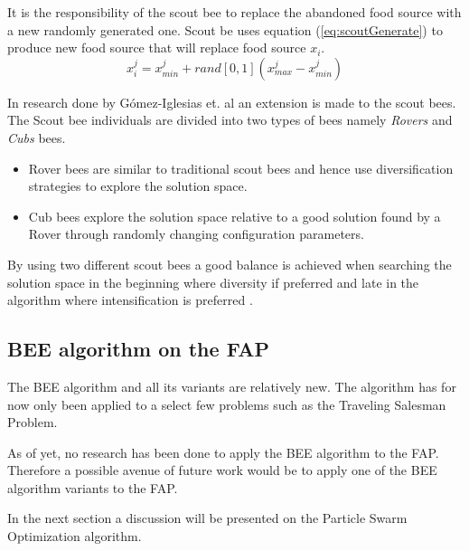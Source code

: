 It is the responsibility of the scout bee to replace the abandoned food source with a new randomly generated one. Scout be uses equation (\ref{eq:scoutGenerate}) to produce new food source that will replace food source $x_i$.
\begin{equation}
\label{eq:scoutGenerate}
x^j_i = x^j_{min} + rand[0,1](x^j_{max} - x^j_{min})
\end{equation}

In research done by G\'{o}mez-Iglesias et. al \cite{ABCFusionGrid} an extension is made to the scout bees. The Scout bee individuals are divided into two types of bees namely \emph{Rovers} and \emph{Cubs} bees\cite{ABCFusionGrid}.
\begin{itemize}
\item{Rover bees} are similar to traditional scout bees and hence use diversification strategies to explore the solution space. 
\item {Cub bees} explore the solution space relative to a good solution found by a Rover through randomly changing configuration parameters. 
\end{itemize}
By using two different scout bees a good balance is achieved when searching the solution space in the beginning where diversity if preferred and late in the algorithm where intensification is preferred \cite{ABCFusionGrid}.
\subsection{BEE algorithm on the FAP}
The BEE algorithm and all its variants are relatively new. The algorithm has for now only been applied to a select few problems such as the Traveling Salesman Problem.

As of yet, no research has been done to apply the BEE algorithm to the FAP. Therefore a possible avenue of future work would be to apply one of the BEE algorithm variants to the FAP.

In the next section a discussion will be presented on the Particle Swarm Optimization algorithm.

